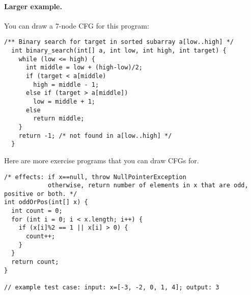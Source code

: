 \documentclass[11pt]{article}
\begin{document}
\newpage
\paragraph{Larger example.} You can draw a 7-node CFG for this program:

\begin{lstlisting}[basicstyle=\scriptsize\ttfamily]
  /** Binary search for target in sorted subarray a[low..high] */
  int binary_search(int[] a, int low, int high, int target) {
    while (low <= high) {
      int middle = low + (high-low)/2;
      if (target < a[middle)
        high = middle - 1;
      else if (target > a[middle])
        low = middle + 1;
      else
        return middle;
    }
    return -1; /* not found in a[low..high] */
  }
\end{lstlisting}

\vspace*{-2em}
\begin{center}
\end{center}

Here are more exercise programs that you can draw CFGs for.
\begin{lstlisting}[basicstyle=\scriptsize\ttfamily]
/* effects: if x==null, throw NullPointerException
            otherwise, return number of elements in x that are odd, positive or both. */
int oddOrPos(int[] x) {
  int count = 0;
  for (int i = 0; i < x.length; i++) {
    if (x[i]%2 == 1 || x[i] > 0) {
      count++;
    }
  }
  return count;
}

// example test case: input: x=[-3, -2, 0, 1, 4]; output: 3  
\end{lstlisting}
\end{document}
